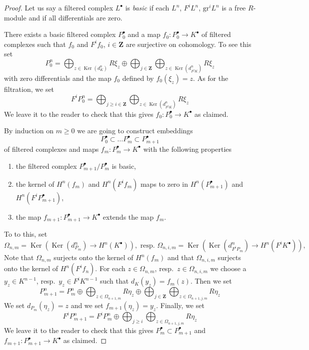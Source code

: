 \documentclass[10pt,a4paper]{amsart}
\theoremstyle{plain}
\theoremstyle{definition}
\theoremstyle{remark}
\numberwithin{equation}{subsection}
\def\Ker{\mathop{\mathrm{Ker}}}
\begin{document}
\begin{proof}
Let us say a filtered complex $L^\bullet$ is {\it basic} if
each $L^n$, $F^iL^n$, $\text{gr}^iL^n$ is a free $R$-module
and if all differentials are zero.

\medskip\noindent
There exists a basic filtered complex $P_0^\bullet$ and a map
$f_0 : P_0^\bullet \to K^\bullet$ of filtered complexes such that
$f_0$ and $F^if_0$, $i \in \mathbf{Z}$ are surjective on cohomology.
To see this set
$$
P_0^n = \bigoplus\nolimits_{z \in \Ker(d_K^n)} R \xi_z
\oplus
\bigoplus\nolimits_{j \in \mathbf{Z}}
\bigoplus\nolimits_{z \in \Ker(d_{F^jK}^n)} R \xi_z
$$
with zero differentials and the map $f_0$ defined by
$f_0(\xi_z) = z$. As for the filtration, we set
$$
F^iP_0^n = \bigoplus\nolimits_{j \geq i \in \mathbf{Z}}
\bigoplus\nolimits_{z \in \Ker(d_{F^jK}^n)} R \xi_z
$$
We leave it to the reader to check that this gives
$f_0 : P_0^\bullet \to K^\bullet$ as claimed.

\medskip\noindent
By induction on $m \geq 0$ we are going to construct embeddings
$$
P_0^\bullet \subset \ldots P_m^\bullet \subset P_{m + 1}^\bullet
$$
of filtered complexes and maps $f_m : P_m^\bullet \to K^\bullet$
with the following properties
\begin{enumerate}
\item the filtered complex $P_{m + 1}^\bullet / P_m^\bullet$ is basic,
\item the kernel of $H^n(f_m)$ and $H^n(F^if_m)$ maps to zero in
$H^n(P_{m + 1}^\bullet)$ and $H^n(F^iP_{m + 1}^\bullet)$,
\item the map $f_{m + 1} : P_{m + 1}^\bullet \to K^\bullet$
extends the map $f_m$.
\end{enumerate}
To to this, set
$$
\Omega_{n, m} = \Ker\left(\Ker(d^n_{P_m}) \to H^n(K^\bullet)\right),
\text{ resp. }
\Omega_{n, i, m} = \Ker\left(\Ker(d^n_{F^iP_m}) \to H^n(F^iK^\bullet)\right),
$$
Note that $\Omega_{n, m}$ surjects onto the kernel of $H^n(f_m)$
and that $\Omega_{n, i, m}$ surjects onto the kernel of $H^n(F^if_n)$.
For each $z \in \Omega_{n, m}$, resp.\ $z \in \Omega_{n, i, m}$
we choose a $y_z \in K^{n - 1}$, resp.\ $y_z \in F^iK^{n - 1}$
such that $d_K(y_z) = f_m(z)$. Then we set
$$
P^n_{m + 1} = P_m^n \oplus
\bigoplus\nolimits_{z \in \Omega_{n + 1, m}} R \eta_z
\oplus
\bigoplus\nolimits_{j \in \mathbf{Z}}
\bigoplus\nolimits_{z \in \Omega_{n + 1, j, m}} R \eta_z
$$
We set $d_{P_m}(\eta_z) = z$ and we set $f_{m + 1}(\eta_z) = y_z$.
Finally, we set
$$
F^iP_{m + 1}^n = F^iP_m^n \oplus
\bigoplus\nolimits_{j \geq i}
\bigoplus\nolimits_{z \in \Omega_{n + 1, j, m}} R \eta_z
$$
We leave it to the reader to check that this gives
$P_m^\bullet \subset P_{m + 1}^\bullet$ and
$f_{m + 1} : P_{m + 1}^\bullet \to K^\bullet$ as claimed.


\end{proof}
\end{document}
